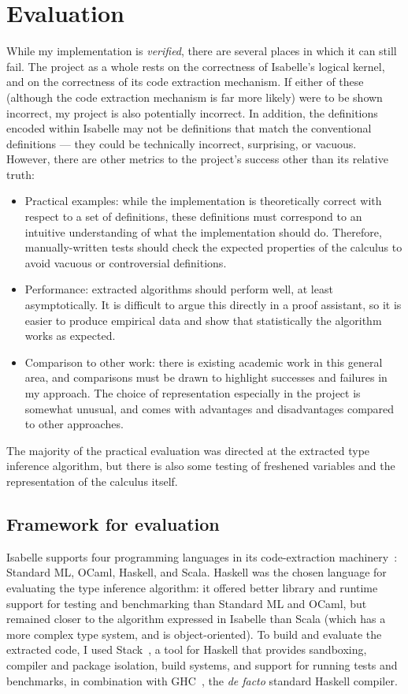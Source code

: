 \chapter{Evaluation}
While my implementation is \emph{verified}, there are several places in which it can still fail.
The project as a whole rests on the correctness of Isabelle's logical kernel, and on the correctness of its code extraction mechanism.
If either of these (although the code extraction mechanism is far more likely) were to be shown incorrect, my project is also potentially incorrect.
In addition, the definitions encoded within Isabelle may not be definitions that match the conventional definitions --- they could be technically incorrect, surprising, or vacuous.
However, there are other metrics to the project's success other than its relative truth:
\begin{itemize}
\item
Practical examples: while the implementation is theoretically correct with respect to a set of definitions, these definitions must correspond to an intuitive understanding of what the implementation should do.
Therefore, manually-written tests should check the expected properties of the calculus to avoid vacuous or controversial definitions.
\item
Performance: extracted algorithms should perform well, at least asymptotically.
It is difficult to argue this directly in a proof assistant, so it is easier to produce empirical data and show that statistically the algorithm works as expected.
\item
Comparison to other work: there is existing academic work in this general area, and comparisons must be drawn to highlight successes and failures in my approach.
The choice of representation especially in the project is somewhat unusual, and comes with advantages and disadvantages compared to other approaches.
\end{itemize}

The majority of the practical evaluation was directed at the extracted type inference algorithm, but there is also some testing of freshened variables and the representation of the calculus itself.

\section{Framework for evaluation}
\label{sec:framework}
Isabelle supports four programming languages in its code-extraction machinery~\cite{codegen-reference}: Standard ML, OCaml, Haskell, and Scala.
Haskell was the chosen language for evaluating the type inference algorithm: it offered better library and runtime support for testing and benchmarking than Standard ML and OCaml, but remained closer to the algorithm expressed in Isabelle than Scala (which has a more complex type system, and is object-oriented).
To build and evaluate the extracted code, I used Stack~\cite{stack}, a tool for Haskell that provides sandboxing, compiler and package isolation, build systems, and support for running tests and benchmarks, in combination with GHC~\cite{GHC}, the \emph{de facto} standard Haskell compiler.


